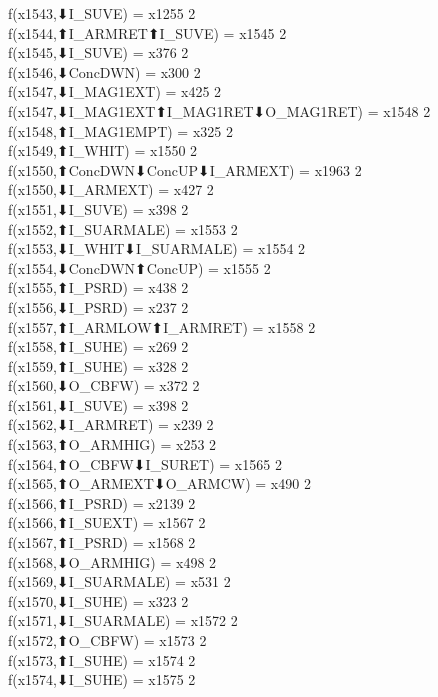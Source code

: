 f(x1543,⬇I_SUVE) = x1255 {2} \\
f(x1544,⬆I_ARMRET⬆I_SUVE) = x1545 {2} \\
f(x1545,⬇I_SUVE) = x376 {2} \\
f(x1546,⬇ConcDWN) = x300 {2} \\
f(x1547,⬇I_MAG1EXT) = x425 {2} \\
f(x1547,⬇I_MAG1EXT⬆I_MAG1RET⬇O_MAG1RET) = x1548 {2} \\
f(x1548,⬆I_MAG1EMPT) = x325 {2} \\
f(x1549,⬆I_WHIT) = x1550 {2} \\
f(x1550,⬆ConcDWN⬇ConcUP⬇I_ARMEXT) = x1963 {2} \\
f(x1550,⬇I_ARMEXT) = x427 {2} \\
f(x1551,⬇I_SUVE) = x398 {2} \\
f(x1552,⬆I_SUARMALE) = x1553 {2} \\
f(x1553,⬇I_WHIT⬇I_SUARMALE) = x1554 {2} \\
f(x1554,⬇ConcDWN⬆ConcUP) = x1555 {2} \\
f(x1555,⬆I_PSRD) = x438 {2} \\
f(x1556,⬇I_PSRD) = x237 {2} \\
f(x1557,⬆I_ARMLOW⬆I_ARMRET) = x1558 {2} \\
f(x1558,⬆I_SUHE) = x269 {2} \\
f(x1559,⬆I_SUHE) = x328 {2} \\
f(x1560,⬇O_CBFW) = x372 {2} \\
f(x1561,⬇I_SUVE) = x398 {2} \\
f(x1562,⬇I_ARMRET) = x239 {2} \\
f(x1563,⬆O_ARMHIG) = x253 {2} \\
f(x1564,⬆O_CBFW⬇I_SURET) = x1565 {2} \\
f(x1565,⬆O_ARMEXT⬇O_ARMCW) = x490 {2} \\
f(x1566,⬆I_PSRD) = x2139 {2} \\
f(x1566,⬆I_SUEXT) = x1567 {2} \\
f(x1567,⬆I_PSRD) = x1568 {2} \\
f(x1568,⬇O_ARMHIG) = x498 {2} \\
f(x1569,⬇I_SUARMALE) = x531 {2} \\
f(x1570,⬇I_SUHE) = x323 {2} \\
f(x1571,⬇I_SUARMALE) = x1572 {2} \\
f(x1572,⬆O_CBFW) = x1573 {2} \\
f(x1573,⬆I_SUHE) = x1574 {2} \\
f(x1574,⬇I_SUHE) = x1575 {2} \\

